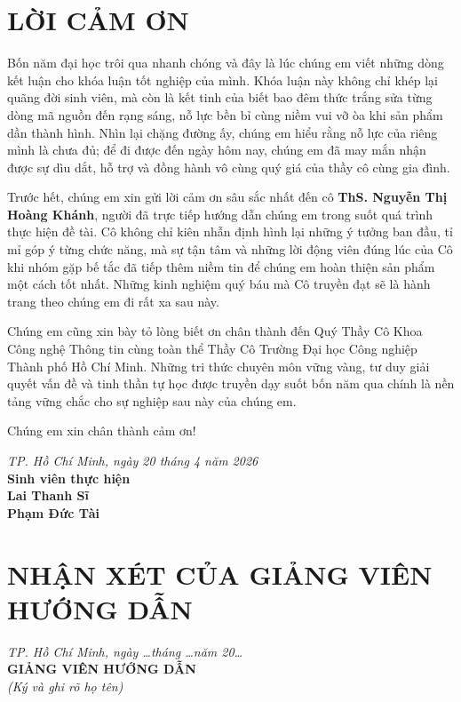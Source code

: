 \newpage
\pagestyle{frontmatter}
\chapter*{LỜI CẢM ƠN}
\thispagestyle{frontmatter}

Bốn năm đại học trôi qua nhanh chóng và đây là lúc chúng em viết những dòng kết luận cho khóa luận tốt nghiệp của mình. Khóa luận này không chỉ khép lại quãng đời sinh viên, mà còn là kết tinh của biết bao đêm thức trắng sửa từng dòng mã nguồn đến rạng sáng, nỗ lực bền bỉ cùng niềm vui vỡ òa khi sản phẩm dần thành hình. Nhìn lại chặng đường ấy, chúng em hiểu rằng nỗ lực của riêng mình là chưa đủ; để đi được đến ngày hôm nay, chúng em đã may mắn nhận được sự dìu dắt, hỗ trợ và đồng hành vô cùng quý giá của thầy cô cùng gia đình.

Trước hết, chúng em xin gửi lời cảm ơn sâu sắc nhất đến cô \textbf{ThS. Nguyễn Thị Hoàng Khánh}, người đã trực tiếp hướng dẫn chúng em trong suốt quá trình thực hiện đề tài. Cô không chỉ kiên nhẫn định hình lại những ý tưởng ban đầu, tỉ mỉ góp ý từng chức năng, mà sự tận tâm và những lời động viên đúng lúc của Cô khi nhóm gặp bế tắc đã tiếp thêm niềm tin để chúng em hoàn thiện sản phẩm một cách tốt nhất. Những kinh nghiệm quý báu mà Cô truyền đạt sẽ là hành trang theo chúng em đi rất xa sau này.

Chúng em cũng xin bày tỏ lòng biết ơn chân thành đến Quý Thầy Cô Khoa Công nghệ Thông tin cùng toàn thể Thầy Cô Trường Đại học Công nghiệp Thành phố Hồ Chí Minh. Những tri thức chuyên môn vững vàng, tư duy giải quyết vấn đề và tinh thần tự học được truyền dạy suốt bốn năm qua chính là nền tảng vững chắc cho sự nghiệp sau này của chúng em.

Chúng em xin chân thành cảm ơn!

\vspace{0.6cm}
\begin{flushright}
    \textit{TP. Hồ Chí Minh, ngày 20 tháng 4 năm 2026}\\
    \textbf{Sinh viên thực hiện}\\
    \textbf{Lai Thanh Sĩ}\\
    \textbf{Phạm Đức Tài}
\end{flushright}

\newpage
\chapter*{NHẬN XÉT CỦA GIẢNG VIÊN HƯỚNG DẪN}
\thispagestyle{frontmatter}
\dotline \dotline \dotline \dotline \dotline
\dotline \dotline \dotline \dotline \dotline
\dotline \dotline \dotline 
\vspace{0.5cm}
\begin{flushright}
    \textit{TP. Hồ Chí Minh, ngày \dots tháng \dots năm 20\dots}\\
    \textbf{GIẢNG VIÊN HƯỚNG DẪN}\\
    \textit{(Ký và ghi rõ họ tên)}\\
    \vspace{1.5cm}
\end{flushright}

